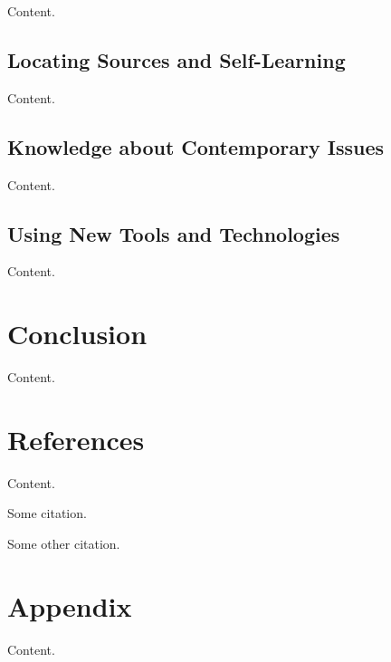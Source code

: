 \documentclass[10pt]{article}
\begin{document}

Content. \cite{something}

\subsection{Locating Sources and Self-Learning}


Content.

\subsection{Knowledge about Contemporary Issues}


Content.

\subsection{Using New Tools and Technologies}


Content.

\section{Conclusion}

Content. \cite{another}

\section{References}

Content.

\begin{thebibliography}{99}

 Some citation.

 Some other citation.

\end{thebibliography}

\section{Appendix}

Content.
\end{document}
